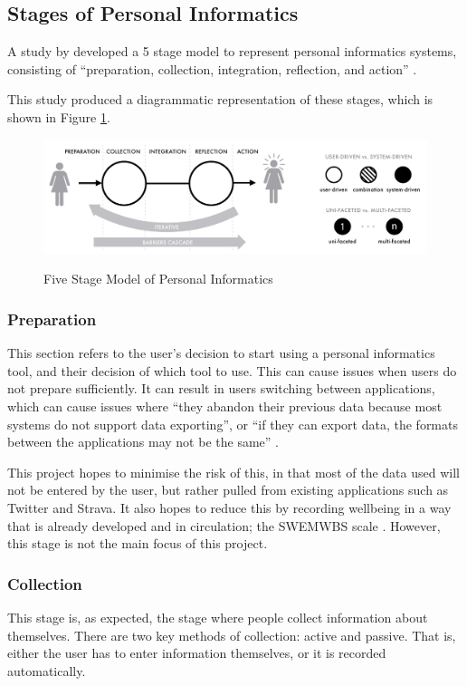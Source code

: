 \documentclass[11pt,openright,a4paper]{report}
\begin{document}
\subsection{Stages of Personal Informatics}
A study by \citeauthor{li2010stage} developed a 5 stage model to represent personal informatics systems, consisting of \enquote{preparation, collection, integration, reflection, and action} \parencite{li2010stage}.
\newpage

This study produced a diagrammatic representation of these stages, which is shown in Figure \ref{fig:5stagespi}.
\begin{figure}[ht]
\centering
\caption{Five Stage Model of Personal Informatics}
\includegraphics[width=\textwidth]{i/5stagespi.png}
\label{fig:5stagespi}
\end{figure}

\subsubsection{Preparation}
This section refers to the user's decision to start using a personal informatics tool, and their decision of which tool to use. This can cause issues when users do not prepare sufficiently. It can result in users switching between applications, which can cause issues where \enquote{they abandon their previous data
because most systems do not support data exporting}, or \enquote{if they can export data, the formats between the applications
may not be the same} \parencite{li2010stage}.

This project hopes to minimise the risk of this, in that most of the data used will not be entered by the user, but rather pulled from existing applications such as Twitter and Strava. It also hopes to reduce this by recording wellbeing in a way that is already developed and in circulation; the SWEMWBS scale \parencite{swemwbs}. However, this stage is not the main focus of this project.

\subsubsection{Collection}
This stage is, as expected, the stage where people collect information about themselves. There are two key methods of collection: active and passive. That is, either the user has to enter information themselves, or it is recorded automatically.
\end{document}
